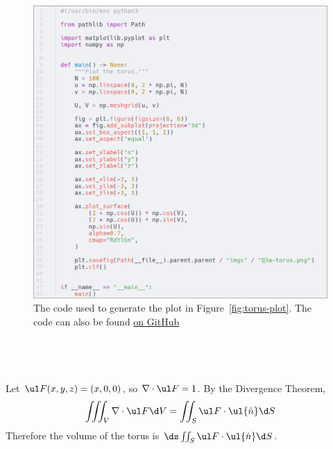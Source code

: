 \documentclass[a4paper]{article}
\begin{document}
\begin{figure}[h]
	\centering
	\includegraphics[scale=0.35]{Q3a-code}
	\caption{The code used to generate the plot in Figure~\ref{fig:torus-plot}. The code can also be found \href{https://github.com/DoctorDalek1963/uni}{on GitHub}}
\end{figure}

\clearpage
\subsection{~}

Let $\ul F(x, y, z) = (x, 0, 0)$, so $\nabla \cdot \ul F = 1$. By the Divergence Theorem, $$\iiint_V \nabla \cdot \ul F \d V = \iint_S \ul F \cdot \ul{\hat n} \d S$$
Therefore the volume of the torus is $\ds \iint_S \ul F \cdot \ul{\hat n} \d S$.
\end{document}
